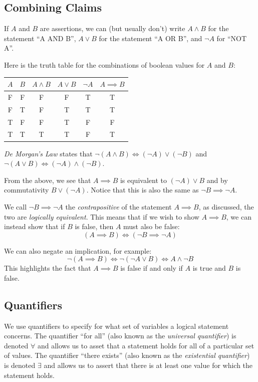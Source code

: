 \documentclass[../main.tex]{subfiles}
\begin{document}
\subsection{Combining Claims}
If $A$ and $B$ are assertions, we can (but usually don't) write $A \land B$ for the statement ``A AND B'', $A \lor B$ for the statement ``A OR B'', and $\lnot A$ for ``NOT A''.

Here is the truth table for the combinations of boolean values for $A$ and $B$:
\begin{center}
\begin{tabular}{c|c|c|c|c|c}
  $A$ & $B$ & $A \land B$ & $A \lor B$ & $\lnot A$ & $A \implies B$ \\
\hline
  F & F & F & F & T & T \\
  F & T & F & T & T & T \\
  T & F & F & T & F & F \\
  T & T & T & T & F & T
\end{tabular}
\end{center}\par
\textit{De Morgan's Law} states that $\lnot (A \land B) \iff (\lnot A) \lor (\lnot B)$ and $\lnot (A \lor B) \iff (\lnot A) \land (\lnot B)$.

From the above, we see that $A \implies B$ is equivalent to $(\lnot A) \lor B$ and by commutativity $B \lor (\lnot A)$.
Notice that this is also the same as $\lnot B \implies \lnot A$.

We call $\lnot B \implies \lnot A$ the \textit{contrapositive} of the statement $A \implies B$, as discussed, the two are \textit{logically equivalent}.
This means that if we wish to show $A \implies B$, we can instead show that if $B$ is false, then $A$ must also be false:
\[
  (A \implies B) \iff (\lnot B \implies \lnot A)
\]

We can also negate an implication, for example:
\[
  \lnot (A \implies B) \iff \lnot (\lnot A \lor B) \iff A \land \lnot B
\]
This highlights the fact that $A \implies B$ is false if and only if $A$ is true and $B$ is false.
\subsection{Quantifiers}
We use quantifiers to specify for what set of variables a logical statement concerns.
The quantifier ``for all'' (also known as the \textit{universal quantifier}) is denoted $\forall$ and allows us to asset that a statement holds for all of a particular set of values.
The quantifier ``there exists'' (also known as the \textit{existential quantifier}) is denoted $\exists$ and allows us to assert that there is at least one value for which the statement holds.
\end{document}
